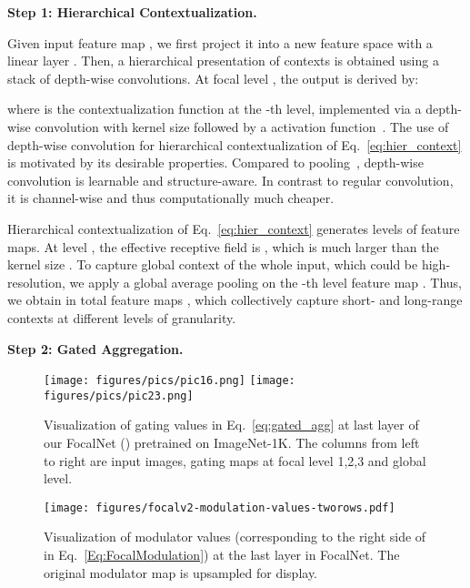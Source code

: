 \documentclass{article}
\begin{document}
\textbf{Step 1: Hierarchical Contextualization.}

Given input feature map , we first project it into a new feature space with a linear layer .
Then, a hierarchical presentation of contexts is obtained using a stack of  depth-wise convolutions.
At focal level , the output   is derived by:

where  is the contextualization function at the -th level, implemented via a depth-wise convolution  with kernel size  followed by a  activation function~\cite{hendrycks2016gaussian}. 
The use of depth-wise convolution for hierarchical contextualization of Eq.~\eqref{eq:hier_context} is motivated by its desirable properties. Compared to pooling~\cite{yu2021metaformer,hu2018squeeze}, depth-wise convolution is learnable and structure-aware. In contrast to regular convolution, it is channel-wise and thus computationally much cheaper. 

Hierarchical contextualization of Eq.~\eqref{eq:hier_context} generates  levels of feature maps. At level , the effective receptive field is , which is much larger than the kernel size . 
To capture global context of the whole input, which could be high-resolution, 
we apply a global average pooling on the -th level feature map . Thus, we obtain in total  feature maps , which collectively capture short- and long-range contexts at different levels of granularity. 



\textbf{Step 2: Gated Aggregation.}
\begin{figure}[t]
\begin{minipage}{0.52\linewidth}
	\centering
    \texttt{[image: figures/pics/pic16.png]}
    \texttt{[image: figures/pics/pic23.png]}
\vspace{-5mm}
    \captionsetup{font=footnotesize}
    \caption{Visualization of gating values  in Eq.~\eqref{eq:gated_agg} at last layer of our FocalNet () pretrained on ImageNet-1K. The columns from left to right are input images, gating maps at focal level 1,2,3 and global level.}
    \label{fig:gating_vis_main}	
	\end{minipage}	
	\quad
	\begin{minipage}{0.44\linewidth}
	\centering
	\texttt{[image: figures/focalv2-modulation-values-tworows.pdf]}	
	\vspace{-6mm}
    \captionsetup{font=footnotesize}
    \caption{Visualization of modulator values (corresponding to the right side of  in Eq.~\eqref{Eq:FocalModulation}) at the last layer in FocalNet. The original modulator map is upsampled for display.}
    \label{fig:modulation}	
	\end{minipage}	
	\vspace{-1mm}
\end{figure}
\end{document}
